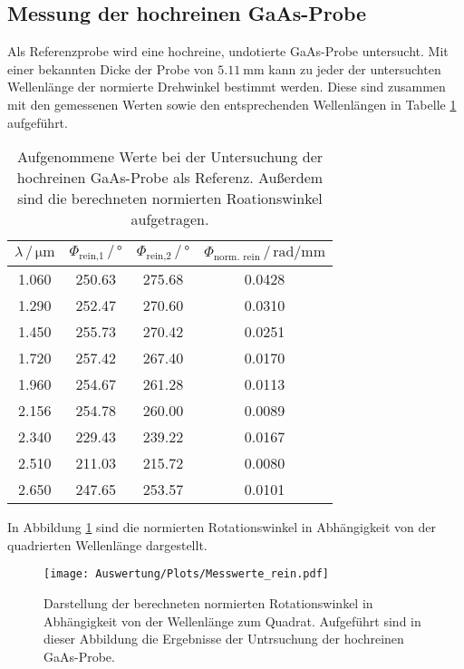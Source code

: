  \subsection{Messung der hochreinen GaAs-Probe}
 Als Referenzprobe wird eine hochreine, undotierte GaAs-Probe untersucht.
 Mit einer bekannten Dicke der Probe von $\SI{5.11}{\milli\meter}$ kann zu jeder der untersuchten
 Wellenlänge der normierte Drehwinkel bestimmt werden. Diese sind zusammen mit den gemessenen Werten sowie den
 entsprechenden Wellenlängen in Tabelle \ref{tab:hr_Messung} aufgeführt.
 \begin{table}[H]
    \centering
    \caption{Aufgenommene Werte bei der Untersuchung der hochreinen GaAs-Probe als Referenz. Außerdem sind die
    berechneten normierten Roationswinkel aufgetragen.}
    \label{tab:hr_Messung}
    \begin{tabular}{cccc}
      \toprule
      $\lambda\, / \, \si{\micro\meter}$ & $\Phi_\text{rein,1} \, / \, \si{\degree}$ & $\Phi_\text{rein,2} \, / \, \si{\degree}$ & $\Phi_\text{norm. rein} \, / \, \si{\radian\per\milli\meter}$  \\
      \midrule
      \num{1.060} & \num{250.63} & \num{275.68} & \num{0.0428}  \\
      \num{1.290} & \num{252.47} & \num{270.60} & \num{0.0310}  \\
      \num{1.450} & \num{255.73} & \num{270.42} & \num{0.0251}  \\
      \num{1.720} & \num{257.42} & \num{267.40} & \num{0.0170}  \\
      \num{1.960} & \num{254.67} & \num{261.28} & \num{0.0113}  \\
      \num{2.156} & \num{254.78} & \num{260.00} & \num{0.0089}  \\
      \num{2.340} & \num{229.43} & \num{239.22} & \num{0.0167}  \\
      \num{2.510} & \num{211.03} & \num{215.72} & \num{0.0080}  \\
      \num{2.650} & \num{247.65} & \num{253.57} & \num{0.0101}  \\
      \bottomrule
    \end{tabular}
   \end{table} \noindent
   In Abbildung \ref{fig:hr_Messung} sind die normierten Rotationswinkel in Abhängigkeit von der quadrierten
   Wellenlänge dargestellt.
   \begin{figure}[H]
       \centering
       \texttt{[image: Auswertung/Plots/Messwerte\_rein.pdf]}
       \caption{Darstellung der berechneten normierten Rotationswinkel in Abhängigkeit von der Wellenlänge
       zum Quadrat. Aufgeführt sind in dieser Abbildung die Ergebnisse der Untrsuchung der hochreinen GaAs-Probe. }
       \label{fig:hr_Messung}
   \end{figure}

